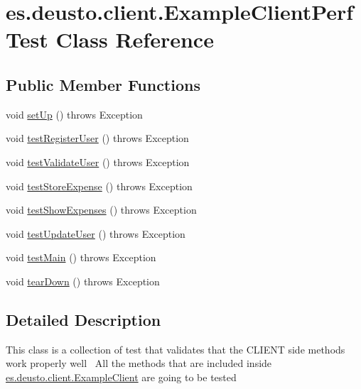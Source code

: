\hypertarget{classes_1_1deusto_1_1client_1_1_example_client_perf_test}{}\section{es.\+deusto.\+client.\+Example\+Client\+Perf\+Test Class Reference}
\label{classes_1_1deusto_1_1client_1_1_example_client_perf_test}
\subsection*{Public Member Functions}
\begin{DoxyCompactItemize}
\item 
void \hyperlink{classes_1_1deusto_1_1client_1_1_example_client_perf_test_a35485dd76fdde06d770768feb4523615}{set\+Up} ()  throws Exception 
\item 
void \hyperlink{classes_1_1deusto_1_1client_1_1_example_client_perf_test_afd0a100c0f00b1925980bd335ff18923}{test\+Register\+User} ()  throws Exception 
\item 
void \hyperlink{classes_1_1deusto_1_1client_1_1_example_client_perf_test_a0a7c514b8bfc7b86ae4e19a52b5302c8}{test\+Validate\+User} ()  throws Exception 
\item 
void \hyperlink{classes_1_1deusto_1_1client_1_1_example_client_perf_test_a41075a3592cd640cf42490074c26bb41}{test\+Store\+Expense} ()  throws Exception 
\item 
void \hyperlink{classes_1_1deusto_1_1client_1_1_example_client_perf_test_ac26b0d5a7e84222f7372cc1783b3f6bb}{test\+Show\+Expenses} ()  throws Exception 
\item 
void \hyperlink{classes_1_1deusto_1_1client_1_1_example_client_perf_test_a625db2684f92cc0f941f5b9282facbcd}{test\+Update\+User} ()  throws Exception 
\item 
void \hyperlink{classes_1_1deusto_1_1client_1_1_example_client_perf_test_a47f0d53e73e6e09381089563bf3efd06}{test\+Main} ()  throws Exception 
\item 
void \hyperlink{classes_1_1deusto_1_1client_1_1_example_client_perf_test_adaeb52fb119e1f3e299f9c2a61c10260}{tear\+Down} ()  throws Exception 
\end{DoxyCompactItemize}


\subsection{Detailed Description}
This class is a collection of test that validates that the C\+L\+I\+E\+NT side methods work properly well~\newline
All the methods that are included inside \hyperlink{classes_1_1deusto_1_1client_1_1_example_client}{es.\+deusto.\+client.\+Example\+Client} are going to be tested 

